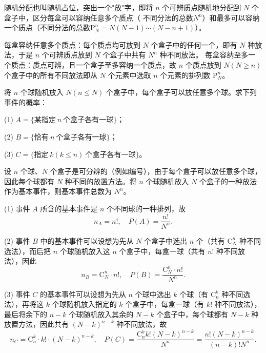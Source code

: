 ﻿\documentclass[lang=cn,11pt]{elegantbook}
\begin{document}
随机分配也叫随机占位，突出一个"放"字，即将 \(n\) 个可辨质点随机地分配到 \(N\) 个盒子中，区分每盒可以容纳任意多个质点（ 不同分法的总数\(N^n\)）和最多可以容纳一个质点（不同分法的总数\(\mathrm{P}_N^n = N(N-1)\cdots(N-n+1)\)）。

\begin{note}
每盒容纳任意多个质点：每个质点均可放到 \(N\) 个盒子中的任何一个，即有 \(N\) 种放法，于是 \(n\) 个可辨质点放到 \(N\) 个盒子中共有 \(N^n\) 种不同放法。\newline
每盒容纳至多一个质点：质点可辨，且一个盒子至多容纳一个质点，故 \(n\) 个质点放到 \(N(N\ge n)\) 个盒子中的所有不同放法即从 \(N\) 个元素中选取 \(n\) 个元素的排列数 \(\mathrm{P}_N^n\)。
\end{note}

\begin{exercise}\label{exer:1-4}
将 \(n\) 个球随机放入 \(N(n\le N)\) 个盒子中，每个盒子可以放任意多个球。求下列事件的概率：\par
(1) \(A=\{\text{某指定} \ n \ \text{个盒子各有一球}\}\)；\par
(2) \(B=\{\text{恰有} \ n \ \text{个盒子各有一球}\}\)；\par
(3) \(C=\{\text{指定} \ k(k\le n) \ \text{个盒子各有一球}\}\)。
\end{exercise}

\begin{solution}
设 \(n\) 个球、\(N\) 个盒子是可分辨的（例如编号），由于每个盒子可以放任意多个球，因此每个球都有 \(N\) 种不同的放置方法。将 \(n\) 个球随机放入 \(N\) 个盒子的一种放法作为基本事件，则基本事件总数为 \(N^n\)。

(1) 事件 \(A\) 所含的基本事件是 \(n\) 个不同球的一种排列，故
\[
n_A = n!, \quad P(A) = \frac{n!}{N^n}.
\]

(2) 事件 \(B\) 中的基本事件可以设想为先从 \(N\) 个盒子中选出 \(n\) 个（共有 \(\mathrm{C}_N^n\) 种不同选法），而后把 \(n\) 个球随机放入这 \(n\) 个盒子中，每盒一球（共有 \(n!\) 种不同放法），因此
\[
n_B = \mathrm{C}_N^n \cdot n!, \quad P(B) = \frac{\mathrm{C}_N^n \cdot n!}{N^n}.
\]

(3) 事件 \(C\) 的基本事件可以设想为先从 \(n\) 个球中选出 \(k\) 个球（有 \(\mathrm{C}_n^k\) 种不同选法），再将这 \(k\) 个球随机放入指定的 \(k\) 个盒子中，每盒一球（有 \(k!\) 种不同放法），最后将余下的 \(n-k\) 个球随机放入其余的 \(N-k\) 个盒子中，每个球都有 \(N-k\) 种放置方法，因此共有 \((N-k)^{n-k}\) 种不同放法，故
\[
n_C = \mathrm{C}_n^k \cdot k! \cdot (N-k)^{n-k}, \quad P(C) = \frac{\mathrm{C}_n^k k! (N-k)^{n-k}}{N^n} = \frac{n! (N-k)^{n-k}}{(n-k)! N^n}.
\]
\end{solution}
\end{document}
